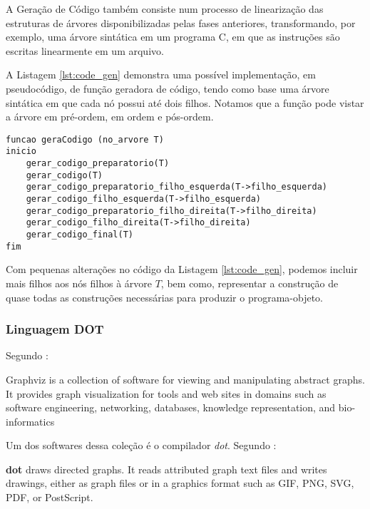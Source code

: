 A Geração de Código também consiste num processo de linearização das
estruturas de árvores disponibilizadas pelas fases anteriores, transformando,
por exemplo, uma árvore sintática em um programa C, em que as instruções são
escritas linearmente em um arquivo.

A Listagem \ref{lst:code_gen} demonstra uma possível implementação, em
pseudocódigo, de função geradora de código, tendo como base uma árvore
sintática em que cada nó possui até dois filhos. Notamos que a função pode
vistar a árvore em pré-ordem, em ordem e pós-ordem.

\begin{lstlisting}[label=lst:code_gen,caption=Exemplo Gerador de Código]
funcao geraCodigo (no_arvore T)
inicio
	gerar_codigo_preparatorio(T)
	gerar_codigo(T)
	gerar_codigo_preparatorio_filho_esquerda(T->filho_esquerda)
	gerar_codigo_filho_esquerda(T->filho_esquerda)
	gerar_codigo_preparatorio_filho_direita(T->filho_direita)
	gerar_codigo_filho_direita(T->filho_direita)
	gerar_codigo_final(T)
fim
\end{lstlisting}

Com pequenas alterações no código da Listagem \ref{lst:code_gen}, podemos
incluir mais filhos aos nós filhos à árvore $T$, bem como, representar a
construção de quase todas as construções necessárias para produzir o
programa-objeto.


\subsubsection{Linguagem DOT}
\label{sec:impl_gen_dot}

Segundo :

\begin{citacao}{4cm}{0cm}
Graphviz is a collection of software for viewing and manipulating abstract
graphs. It provides graph visualization for tools and web sites in domains
such as software engineering, networking, databases, knowledge representation,
and bio-informatics
\end{citacao}

Um dos softwares dessa coleção é o compilador \emph{dot}. Segundo
:

\begin{citacao}{4cm}{0cm}
\textbf{dot} draws directed graphs. It reads attributed graph text files and
writes drawings, either as graph files or in a graphics format such as GIF,
PNG, SVG, PDF, or PostScript.
\end{citacao}

